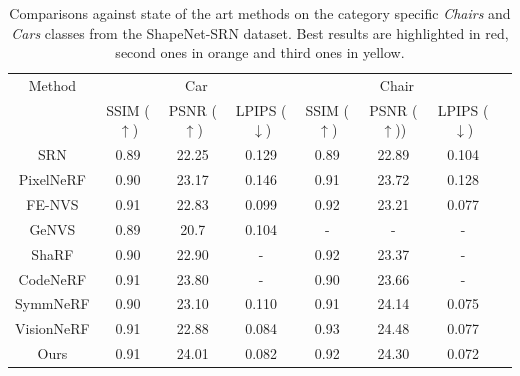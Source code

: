 \begin{table}[htp!]
\caption{Comparisons against state of the art methods on the category specific \textit{Chairs} and \textit{Cars} classes from the ShapeNet-SRN dataset. Best results are highlighted in red, second ones in orange and third ones in yellow. }
\label{table:comp_res}
\centering%
\begin{adjustbox}{height=2.3cm}
\begin{tabular}[h]{c||ccccccc}
\hline
 Method & \multicolumn{3}{c}{Car} & \multicolumn{3}{c}{Chair} \\
 &  SSIM ($\uparrow$) & PSNR ($\uparrow$) & LPIPS ($\downarrow$) & SSIM ($\uparrow$) & PSNR ($\uparrow$)) & LPIPS ($\downarrow$)\\
\hline
SRN \citep{sitzmann2019scene}& \cellcolor{yellow!25}0.89 & 22.25 & 0.129 & 0.89 & 22.89 & 0.104\\
PixelNeRF \citep{yu2021pixelnerf} & \cellcolor{orange!25}0.90 & 23.17 & 0.146 & \cellcolor{yellow!25}0.91 & 23.72 & 0.128\\
FE-NVS \citep{guo2022fast} & \cellcolor{red!25}0.91 & 22.83 & \cellcolor{yellow!25}0.099 & \cellcolor{orange!25}0.92 & 23.21 & 0.077 \\
GeNVS\citep{chan2023genvs}& \cellcolor{yellow!25}0.89 & 20.7 & 0.104 & - & - & - \\
ShaRF \citep{rematas2021sharf} & \cellcolor{orange!25}0.90 & 22.90 & - & \cellcolor{orange!25}0.92 & 23.37 & - \\
CodeNeRF \citep{jang2021codenerf} & \cellcolor{red!25}0.91 & \cellcolor{orange!25}23.80 & - & 0.90 & 23.66 & -  \\
SymmNeRF\footnotemark\citep{li2022symmnerf}& \cellcolor{orange!25}0.90 & \cellcolor{yellow!25}23.10 & 0.110 & \cellcolor{yellow!25}0.91 & \cellcolor{yellow!25}24.14  & \cellcolor{orange!25}0.075 \\
VisionNeRF \citep{lin2023vision} & \cellcolor{red!25}0.91 & 22.88 & \cellcolor{orange!25}0.084 & \cellcolor{red!25}0.93 & \cellcolor{red!25}24.48  & \cellcolor{yellow!25}0.077 \\
Ours &\cellcolor{red!25} 0.91 & \cellcolor{red!25}24.01 &\cellcolor{red!25} 0.082 &  \cellcolor{orange!25} 0.92 & \cellcolor{orange!25}24.30 & \cellcolor{red!25}0.072 \\

\hline 
\end{tabular}
\end{adjustbox}
\end{table}

